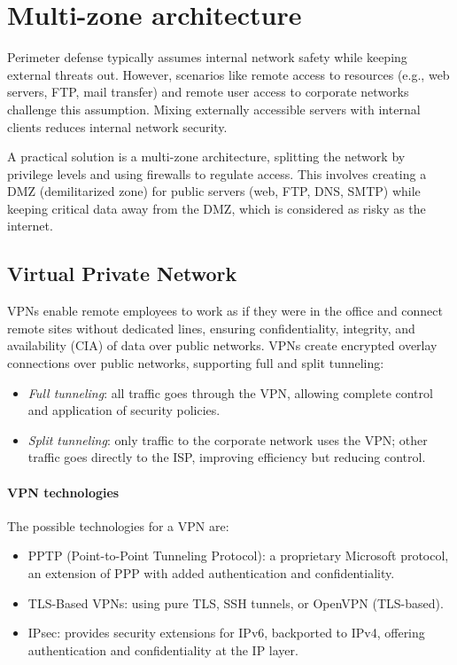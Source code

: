\section{Multi-zone architecture}

Perimeter defense typically assumes internal network safety while keeping external threats out. 
However, scenarios like remote access to resources (e.g., web servers, FTP, mail transfer) and remote user access to corporate networks challenge this assumption. 
Mixing externally accessible servers with internal clients reduces internal network security.

A practical solution is a multi-zone architecture, splitting the network by privilege levels and using firewalls to regulate access. 
This involves creating a DMZ (demilitarized zone) for public servers (web, FTP, DNS, SMTP) while keeping critical data away from the DMZ, which is considered as risky as the internet.

\subsection{Virtual Private Network}
VPNs enable remote employees to work as if they were in the office and connect remote sites without dedicated lines, ensuring confidentiality, integrity, and availability (CIA) of data over public networks. 
VPNs create encrypted overlay connections over public networks, supporting full and split tunneling:
\begin{itemize}
    \item \textit{Full tunneling}: all traffic goes through the VPN, allowing complete control and application of security policies.
    \item \textit{Split tunneling}: only traffic to the corporate network uses the VPN; other traffic goes directly to the ISP, improving efficiency but reducing control.
\end{itemize}

\paragraph*{VPN technologies}
The possible technologies for a VPN are: 
\begin{itemize}
    \item PPTP (Point-to-Point Tunneling Protocol): a proprietary Microsoft protocol, an extension of PPP with added authentication and confidentiality.
    \item TLS-Based VPNs: using pure TLS, SSH tunnels, or OpenVPN (TLS-based).
    \item IPsec: provides security extensions for IPv6, backported to IPv4, offering authentication and confidentiality at the IP layer.
\end{itemize}